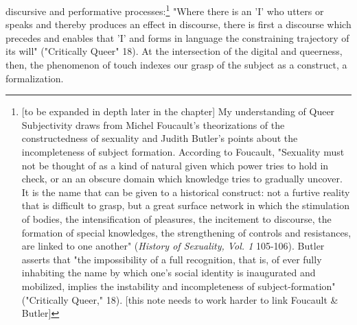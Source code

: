 \documentclass[11pt]{article}
\begin{document}
discursive and performative processes:\footnote{[to be expanded in depth later in the chapter] My understanding
of Queer Subjectivity draws from Michel Foucault's theorizations of
the constructedness of sexuality and Judith Butler's points about the
incompleteness of subject formation. According to Foucault, "Sexuality
must not be thought of as a kind of natural given which power tries to
hold in check, or an an obscure domain which knowledge tries to
gradually uncover. It is the name that can be given to a historical
construct: not a furtive reality that is difficult to grasp, but a
great surface network in which the stimulation of bodies, the
intensification of pleasures, the incitement to discourse, the
formation of special knowledges, the strengthening of controls and
resistances, are linked to one another" (\emph{History of Sexuality,
Vol. 1} 105-106). Butler asserts that "the impossibility of a full
recognition, that is, of ever fully inhabiting the name by which one's
social identity is inaugurated and mobilized, implies the instability
and incompleteness of subject-formation" ("Critically Queer,"
18). [this note needs to work harder to link Foucault \& Butler]} "Where there is an 'I'
who utters or speaks and thereby produces an effect in discourse,
there is first a discourse which precedes and enables that 'I' and
forms in language the constraining trajectory of its will"
("Critically Queer" 18). At the intersection of the digital and
queerness, then, the phenomenon of touch indexes our grasp of the
subject as a construct, a formalization.
\end{document}
